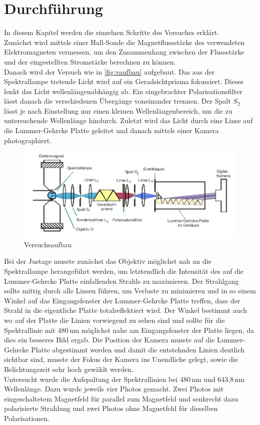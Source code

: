 \section{Durchführung}
\label{sec:Durchfuehrung}
In diesem Kapitel werden die einzelnen Schritte des Versuches erklärt.\\

Zunächst wird mittels einer Hall-Sonde die Magnetflussstärke des verwendeten Elektromagneten vermessen, um den Zusammenhang zwischen der Flussstärke und der eingestellten Stromstärke berechnen zu können.\\
Danach wird der Versuch wie in \autoref{fig:vaufbau} aufgebaut.
Das aus der Spektrallampe tretende Licht wird auf ein Geradsichtprisma fokussiert.
Dieses lenkt das Licht wellenlängenabhängig ab.
Ein eingebrachter Polarisationsfilter lässt danach die verschiedenen Übergänge voneinander trennen.
Der Spalt $S_2$ lässt je nach Einstellung nur einen kleinen Wellenlängenbereich, um die zu untersuchende Wellenlänge hindurch.
Zuletzt wird das Licht durch eine Linse auf die Lummer-Gehrcke Platte geleitet und danach mittels einer Kamera photographiert.

\begin{figure}
\includegraphics[width=1\textwidth]{content/grafiken/Aufbau.jpg}
\caption{Versuchsaufbau}
\label{fig:vaufbau}
\end{figure}


Bei der Justage musste zunächst das Objektiv möglichst nah an die Spektrallampe herangeführt werden, um letztendlich die Intensität des auf die Lummer-Gehrcke Platte einfallenden Strahls zu maximieren.
Der Strahlgang sollte mittig durch alle Linsen führen, um Verluste zu minimieren und in so einem Winkel auf das Eingangsfenster der Lummer-Gehrcke Platte treffen, dass der Strahl in die eigentliche Platte totalreflektiert wird. 
Der Winkel bestimmt auch wo auf der Platte die Linien vorwiegend zu sehen sind und sollte für die Spektrallinie mit 480\,nm möglichst nahe am Eingangsfenster der Platte liegen, da dies ein besseres Bild ergab.
Die Position der Kamera musste auf die Lummer-Gehrcke Platte abgestimmt werden und damit die entstehnden Linien deutlich sichtbar sind, musste der Fokus der Kamera ins Unendliche gelegt, sowie die Belichtungszeit sehr hoch gewählt werden.\\
Untersucht wurde die Aufspaltung der Spektrallinien bei 480\,nm und 643,8\,nm Wellenlänge. Dazu wurde jeweils vier Photos gemacht.
Zwei Photos mit eingeschaltetem Magnetfeld für parallel zum Magnetfeld und senkrecht dazu polarisierte Strahlung und zwei Photos ohne Magnetfeld für dieselben Polarisationen.
